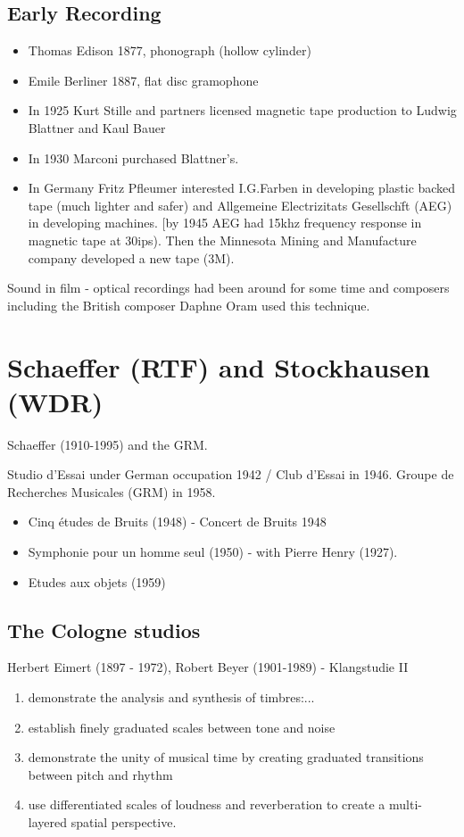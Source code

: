 \subsection{Early Recording}
\begin{itemize}
\item Thomas Edison 1877, phonograph (hollow cylinder)
\item Emile Berliner 1887, flat disc gramophone
\item In 1925 Kurt Stille and partners licensed magnetic tape production to Ludwig Blattner and Kaul Bauer
\item In 1930 Marconi purchased Blattner's.
\item In Germany Fritz Pfleumer interested I.G.Farben in developing plastic backed tape (much lighter and safer) and Allgemeine Electrizitats Gesellsch\"ft (AEG) in developing machines. [by 1945 AEG had 15khz frequency response in magnetic tape at 30ips). Then the Minnesota Mining and Manufacture company developed a new tape (3M).
\end{itemize}

Sound in film - optical recordings had been around for some time and composers including the British composer Daphne Oram used this technique.

\section{Schaeffer (RTF) and Stockhausen (WDR)}

Schaeffer (1910-1995) and the GRM.

Studio d'Essai under German occupation 1942 / Club d'Essai in 1946. Groupe de Recherches Musicales (GRM) in 1958.

\begin{itemize}
\item Cinq \'etudes de Bruits (1948) - Concert de Bruits 1948
\item Symphonie pour un homme seul (1950) - with Pierre Henry (1927).
\item Etudes aux objets (1959)
\end{itemize}

\subsection{The Cologne studios}

Herbert Eimert (1897 - 1972), Robert Beyer (1901-1989) - Klangstudie II

\begin{enumerate}
\item demonstrate the analysis and synthesis of timbres:...
\item establish finely graduated scales between tone and noise
\item demonstrate the unity of musical time by creating graduated transitions between pitch and rhythm
\item use differentiated scales of loudness and reverberation to create a multi-layered spatial perspective.
\end{enumerate}


